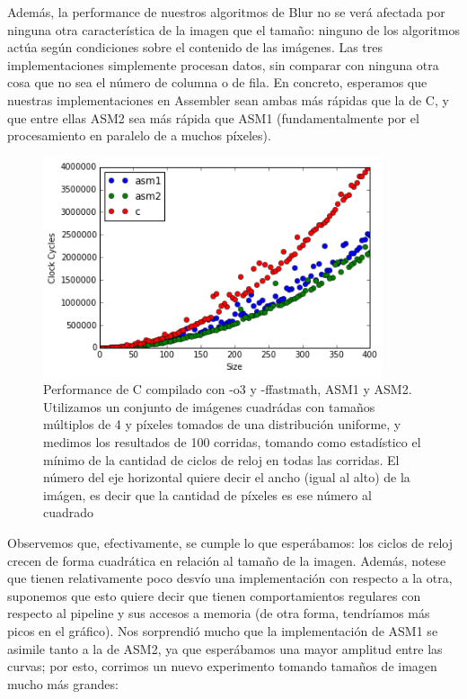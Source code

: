 Además, la performance de nuestros algoritmos de Blur no se verá afectada por ninguna otra característica de la imagen que el tamaño: ninguno de los algoritmos actúa según condiciones sobre el contenido de las imágenes. Las tres implementaciones simplemente procesan datos, sin comparar con ninguna otra cosa que no sea el número de columna o de fila. En concreto, esperamos que nuestras implementaciones en Assembler sean ambas más rápidas que la de C, y que entre ellas ASM2 sea más rápida que ASM1 (fundamentalmente por el procesamiento en paralelo de a muchos píxeles).

\begin{figure}[H]
	\centering
  \includegraphics[width=10cm]{images/blur-imagenes-chicas.png}
  \caption{Performance de C compilado con -o3 y -ffastmath, ASM1 y ASM2. Utilizamos un conjunto de imágenes cuadrádas con tamaños múltiplos de 4 y píxeles tomados de una distribución uniforme, y medimos los resultados de 100 corridas, tomando como estadístico el mínimo de la cantidad de ciclos de reloj en todas las corridas. El número del eje horizontal quiere decir el ancho (igual al alto) de la imágen, es decir que la cantidad de píxeles es ese número al cuadrado}
\end{figure}

Observemos que, efectivamente, se cumple lo que esperábamos: los ciclos de reloj crecen de forma cuadrática en relación al tamaño de la imagen. Además, notese que tienen relativamente poco desvío una implementación con respecto a la otra, suponemos que esto quiere decir que tienen comportamientos regulares con respecto al pipeline y sus accesos a memoria (de otra forma, tendríamos más picos en el gráfico). Nos sorprendió mucho que la implementación de ASM1 se asimile tanto a la de ASM2, ya que esperábamos una mayor amplitud entre las curvas; por esto, corrimos un nuevo experimento tomando tamaños de imagen mucho más grandes:

